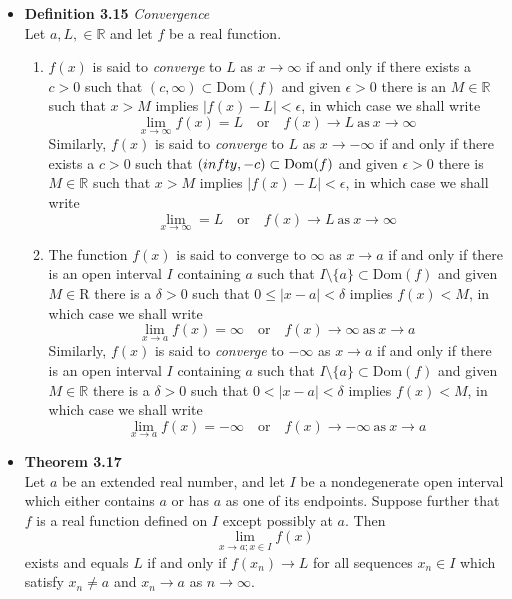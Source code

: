 \documentclass[11pt,a4paper]{article}
\begin{document}
\begin{itemize}
    \item \textbf{Definition 3.15} \emph{Convergence} \\
        Let $a, L, \in \mathbb{R}$ and let $f$ be a real function.
        \begin{enumerate}
            \item $f(x)$ is said to \emph{converge} to $L$ as $x \to \infty$ if and only if
                there exists a $c > 0$ such that $(c, \infty) \subset \mathrm{Dom}(f)$
                and given $\epsilon > 0$ there is an $M \in \mathbb{R}$ such that
                $x > M$ implies $|f(x) - L| < \epsilon$, in which case we shall write
                \[
                    \lim_{x \to \infty} f(x) = L \quad \text{or} \quad
                    f(x) \to L \ \text{as} \ x \to \infty
                \]
                Similarly, $f(x)$ is said to \emph{converge} to $L$ as $x \to -\infty$
                if and only if there exists a $c > 0$ such that
                $(\-infty, -c) \subset \mathrm{Dom}(f)$ and given $\epsilon > 0$ there is
                $M \in \mathbb{R}$ such that $x > M$ implies $|f(x) - L| < \epsilon$,
                in which case we shall write
                \[
                    \lim_{x \to \infty} = L \quad \text{or} \quad
                    f(x) \to L \ \text{as} \ x \to \infty
                \]
            \item The function $f(x)$ is said to converge to $\infty$ as $x \to a$
                if and only if there is an open interval $I$ containing $a$ such that
                $I \setminus \{a\} \subset \mathrm{Dom}(f)$ and given $M \in \mathrm{R}$
                there is a $\delta > 0$ such that $0 \leq |x - a| < \delta$ implies
                $f(x) < M$, in which case we shall write
                \[
                    \lim_{x \to a} f(x) = \infty \quad \text{or} \quad
                    f(x) \to \infty \ \text{as} \ x \to a
                \]
                Similarly, $f(x)$ is said to \emph{converge} to $-\infty$ as $x \to a$
                if and only if there is an open interval $I$ containing $a$ such that
                $I \setminus \{a\} \subset \mathrm{Dom}(f)$ and given $M \in \mathbb{R}$
                there is a $\delta > 0$ such that $0 < |x-a| < \delta$ implies $f(x) < M$,
                in which case we shall write
                \[
                    \lim_{x \to a} f(x) = -\infty \quad \text{or} \quad
                    f(x) \to -\infty \ \text{as} \ x \to a
                \]

        \end{enumerate}

    \item \textbf{Theorem 3.17} \\
        Let $a$ be an extended real number, and let $I$ be a nondegenerate open interval which
        either contains $a$ or has $a$ as one of its endpoints.
        Suppose further that $f$ is a real function defined on $I$ except possibly at $a$.
        Then
        \[
            \lim_{x \to a; x \in I} f(x)
        \]
        exists and equals $L$ if and only if $f(x_n) \to L$ for all sequences $x_n \in I$
        which satisfy $x_n \neq a$ and $x_n \to a$ as $n \to \infty$.
\end{itemize}
\end{document}
